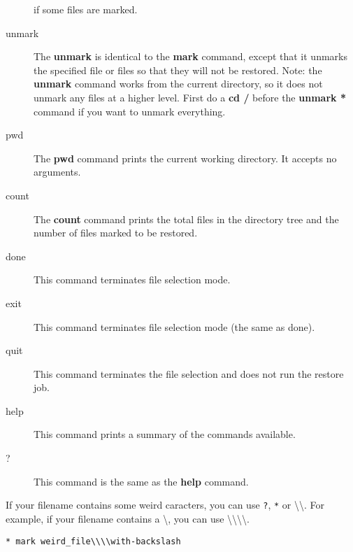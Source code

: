 \begin{description}
\begin{verbatim}
\end{verbatim}
\normalsize

   if some files are marked.

\item [unmark]
   The {\bf unmark} is identical to the {\bf mark}  command, except that it
   unmarks the specified file or files so that  they will not be restored. Note:
   the {\bf unmark} command works from  the current directory, so it does not
   unmark any files at a higher  level. First do a {\bf cd /} before the {\bf
   unmark *} command if  you want to unmark everything.

\item [pwd]
   The {\bf pwd} command prints the current working  directory. It accepts no
   arguments.

\item [count]
   The {\bf count} command prints the total files in the  directory tree and the
   number of files marked to be restored.

\item [done]
   This command terminates file selection mode.

\item [exit]
   This command terminates file selection mode (the same as  done).

\item [quit]
   This command terminates the file selection and does  not run the restore
job.


\item [help]
   This command prints a summary of the commands available.

\item [?]
   This command is the same as the {\bf help} command.
\end{description}

If your filename contains some weird caracters, you can use \texttt{?},
\texttt{*} or \textbackslash{}\textbackslash{}. For example, if your filename
contains a \textbackslash{}, you can use
\textbackslash{}\textbackslash{}\textbackslash{}\textbackslash{}.

\begin{verbatim}
* mark weird_file\\\\with-backslash
\end{verbatim}

